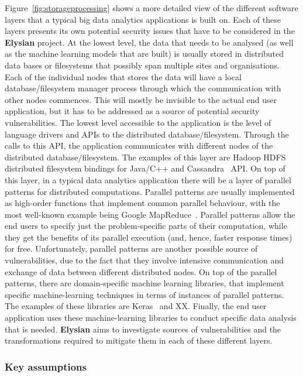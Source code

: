 \documentclass[a4paper,11pt]{article}
\newcommand{\project}[1]{\textbf{#1}\xspace}
\newcommand{\SECURITY}{\project{Elysian}}
\newcommand{\TheProject}{\SECURITY}
\begin{document}
Figure~\ref{fig:storageprocessing} shows a more detailed view of the different software layers that a typical big data analytics applications is built on. Each of these layers presents its own potential security issues that have to be considered in the \TheProject{} project. At the lowest level, the data that needs to be analysed (as well as the machine learning models that are built) is usually stored in distributed data bases or filesystems that possibly span multiple sites and organisations. Each of the individual nodes that stores the data will have a local database/filesystem manager process through which the communication with other nodes commences. This will mostly be invisible to the actual end user application, but it has to be addressed as a source of potential security vulnerabilities. The lowest level accessible to the application is the level of language drivers and APIs to the distributed database/filesystem. Through the calls to this API, the application communicates with different nodes of the distributed database/filesystem. The examples of this layer are Hadoop HDFS~\cite{hdfs} distributed filesystem bindings for Java/C++ and Cassandra~\cite{cassandra} API. On top of this layer, in a typical data analytics application there will be a layer of parallel patterns for distributed computations. Parallel patterns are usually implemented as high-order functions that implement common parallel behaviour, with the most well-known example being Google MapReduce~\cite{mapreduce}. Parallel patterns allow the end users to specify just the problem-specific parts of their computation, while they get the benefits of its parallel execution (and, hence, faster response times) for free. Unfortunately, parallel patterns are another possible source of vulnerabilities, due to the fact that they involve intensive communication and exchange of data between different distributed nodes. On top of the parallel patterns, there are domain-specific machine learning libraries, that implement specific machine-learning techniques in terms of instances of parallel patterns. The examples of these libraries are Keras~\cite{keras} and XX. Finally, the end user application uses these machine-learning libraries to conduct specific data analysis that is needed. \TheProject{} aims to investigate sources of vulnerabilities and the transformations required to mitigate them in each of these different layers.

\subsubsection*{Key assumptions}
\end{document}
